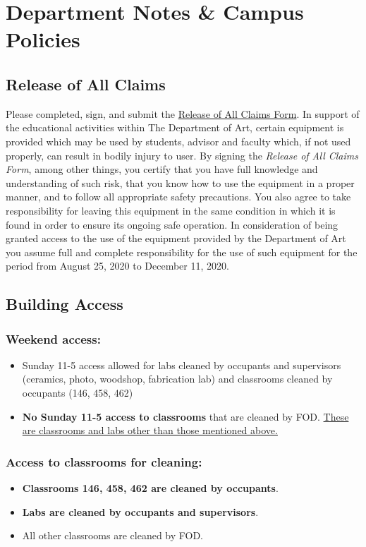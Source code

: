 \section[Campus Policies]{Department Notes \& Campus Policies}
\subsection{Release of All Claims}
Please completed, sign, and submit the \href{https://drive.google.com/file/d/1lfmTV3G5hzwf4YUvxlSUWwahs2fQIglq/view?usp=sharing}{Release of All Claims Form}. In support of the educational activities within The Department of Art, certain equipment is provided which may be used by students, advisor and faculty which, if not used properly, can result in bodily injury to user. By signing the \emph{Release of All Claims Form}, among other things, you certify that you have full knowledge and understanding of such risk, that you know how to use the equipment in a proper manner, and to follow all appropriate safety precautions. You also agree to take responsibility for leaving this equipment in the same condition in which it is found in order to ensure its ongoing safe operation. In consideration of being granted access to the use of the equipment provided by the Department of Art you assume full and complete responsibility for the use of such equipment for the period from August 25, 2020 to December 11, 2020.

\subsection{Building Access}
\subsubsection{Weekend access:}
\begin{itemize}
      \tightlist
      \item Sunday 11-5 access allowed for labs cleaned by occupants and supervisors (ceramics, photo, woodshop, fabrication lab) and classrooms cleaned by occupants (146, 458, 462)
      \item \textbf{No Sunday 11-5 access to classrooms} that are cleaned by FOD. \ul{These are classrooms and labs other than those mentioned above.}
\end{itemize}

\subsubsection{Access to classrooms for cleaning:}
\begin{itemize}
      \tightlist
      \item \textbf{Classrooms 146, 458, 462 are cleaned by occupants}.
      \item \textbf{Labs are cleaned by occupants and supervisors}.
      \item All other classrooms are cleaned by FOD.
\end{itemize}


